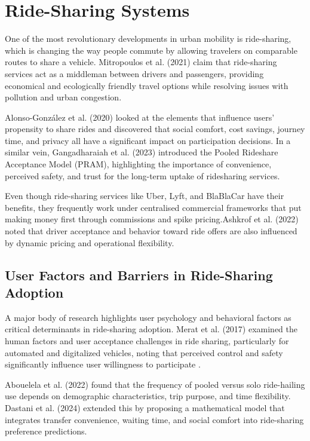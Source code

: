\section{Ride-Sharing Systems}

One of the most revolutionary developments in urban mobility is ride-sharing, which is changing the way people commute by allowing travelers on comparable routes to share a vehicle. Mitropoulos et al. (2021) claim that ride-sharing services act as a middleman between drivers and passengers, providing economical and ecologically friendly travel options while resolving issues with pollution and urban congestion\cite{mitropoulos2021}.

Alonso-González et al. (2020) looked at the elements that influence users' propensity to share rides and discovered that social comfort, cost savings, journey time, and privacy all have a significant impact on participation decisions\cite{alonso2020}. In a similar vein, Gangadharaiah et al. (2023) introduced the Pooled Rideshare Acceptance Model (PRAM), highlighting the importance of convenience, perceived safety, and trust for the long-term uptake of ridesharing services\cite{gangadharaiah2023}.

Even though ride-sharing services like Uber, Lyft, and BlaBlaCar have their benefits, they frequently work under centralised commercial frameworks that put making money first through commissions and spike pricing.Ashkrof et al. (2022) noted that driver acceptance and behavior toward ride offers are also influenced by dynamic pricing and operational flexibility\cite{ashkrof2022}.


\subsection{User Factors and Barriers in Ride-Sharing Adoption}
A major body of research highlights user psychology and behavioral factors as critical determinants in ride-sharing adoption. Merat et al. (2017) examined the human factors and user acceptance challenges in ride sharing, particularly for automated and digitalized vehicles, noting that perceived control and safety significantly influence user willingness to participate \cite{merat2017}.

Abouelela et al. (2022) found that the frequency of pooled versus solo ride-hailing use depends on demographic characteristics, trip purpose, and time flexibility\cite{abouelela2022}. Dastani et al. (2024) extended this by proposing a mathematical model that integrates transfer convenience, waiting time, and social comfort into ride-sharing preference predictions\cite{dastani2024}.

